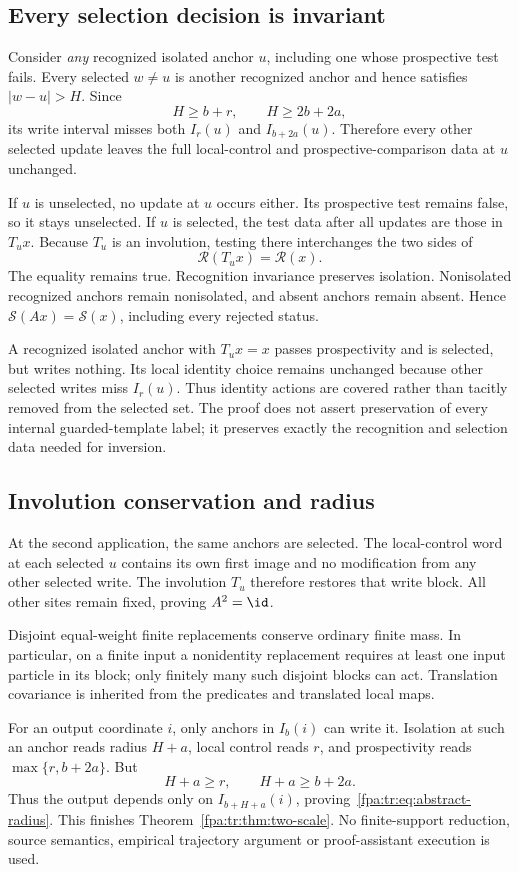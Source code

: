\documentclass[11pt,a4paper]{article}
\numberwithin{equation}{section}
\newcommand{\Rec}{\mathcal R}\newcommand{\Sel}{\mathcal S}
\begin{document}
\subsection{Every selection decision is invariant}
Consider \emph{any} recognized isolated anchor $u$, including one whose prospective test fails. Every selected $w\ne u$ is another recognized anchor and hence satisfies $|w-u|>H$. Since
\[
H\ge b+r,\qquad H\ge2b+2a,
\]
its write interval misses both $I_r(u)$ and $I_{b+2a}(u)$. Therefore every other selected update leaves the full local-control and prospective-comparison data at $u$ unchanged.

If $u$ is unselected, no update at $u$ occurs either. Its prospective test remains false, so it stays unselected. If $u$ is selected, the test data after all updates are those in $T_u x$. Because $T_u$ is an involution, testing there interchanges the two sides of
\[
\Rec(T_u x)=\Rec(x).
\]
The equality remains true. Recognition invariance preserves isolation. Nonisolated recognized anchors remain nonisolated, and absent anchors remain absent. Hence $\Sel(Ax)=\Sel(x)$, including every rejected status.

A recognized isolated anchor with $T_u x=x$ passes prospectivity and is selected, but writes nothing. Its local identity choice remains unchanged because other selected writes miss $I_r(u)$. Thus identity actions are covered rather than tacitly removed from the selected set. The proof does not assert preservation of every internal guarded-template label; it preserves exactly the recognition and selection data needed for inversion.

\subsection{Involution conservation and radius}
At the second application, the same anchors are selected. The local-control word at each selected $u$ contains its own first image and no modification from any other selected write. The involution $T_u$ therefore restores that write block. All other sites remain fixed, proving $A^2=\id$.

Disjoint equal-weight finite replacements conserve ordinary finite mass. In particular, on a finite input a nonidentity replacement requires at least one input particle in its block; only finitely many such disjoint blocks can act. Translation covariance is inherited from the predicates and translated local maps.

For an output coordinate $i$, only anchors in $I_b(i)$ can write it. Isolation at such an anchor reads radius $H+a$, local control reads $r$, and prospectivity reads $\max\{r,b+2a\}$. But
\[
H+a\ge r,\qquad H+a\ge b+2a.
\]
Thus the output depends only on $I_{b+H+a}(i)$, proving~\eqref{fpa:tr:eq:abstract-radius}. This finishes Theorem~\ref{fpa:tr:thm:two-scale}. No finite-support reduction, source semantics, empirical trajectory argument or proof-assistant execution is used.
\end{document}
